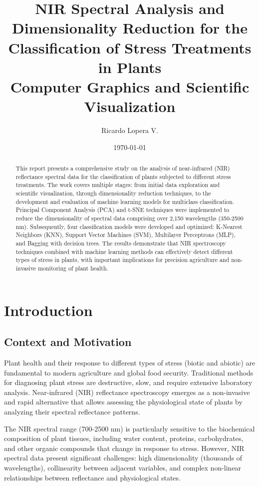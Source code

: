 \documentclass[12pt,a4paper]{article}
\title{
    \vspace{-2cm}
    \textbf{NIR Spectral Analysis and Dimensionality Reduction for the Classification of Stress Treatments in Plants}\\
    \large Computer Graphics and Scientific Visualization
}
\author{Ricardo Lopera V.}
\date{\today}
\begin{document}
\maketitle

\begin{abstract}
This report presents a comprehensive study on the analysis of near-infrared (NIR) reflectance spectral data for the classification of plants subjected to different stress treatments. The work covers multiple stages: from initial data exploration and scientific visualization, through dimensionality reduction techniques, to the development and evaluation of machine learning models for multiclass classification. Principal Component Analysis (PCA) and t-SNE techniques were implemented to reduce the dimensionality of spectral data comprising over 2,150 wavelengths (350-2500 nm). Subsequently, four classification models were developed and optimized: K-Nearest Neighbors (KNN), Support Vector Machines (SVM), Multilayer Perceptrons (MLP), and Bagging with decision trees. The results demonstrate that NIR spectroscopy techniques combined with machine learning methods can effectively detect different types of stress in plants, with important implications for precision agriculture and non-invasive monitoring of plant health.
\end{abstract}

\tableofcontents
\newpage

\section{Introduction}

\subsection{Context and Motivation}

Plant health and their response to different types of stress (biotic and abiotic) are fundamental to modern agriculture and global food security. Traditional methods for diagnosing plant stress are destructive, slow, and require extensive laboratory analysis. Near-infrared (NIR) reflectance spectroscopy emerges as a non-invasive and rapid alternative that allows assessing the physiological state of plants by analyzing their spectral reflectance patterns.

The NIR spectral range (700-2500 nm) is particularly sensitive to the biochemical composition of plant tissues, including water content, proteins, carbohydrates, and other organic compounds that change in response to stress. However, NIR spectral data present significant challenges: high dimensionality (thousands of wavelengths), collinearity between adjacent variables, and complex non-linear relationships between reflectance and physiological states.
\end{document}

